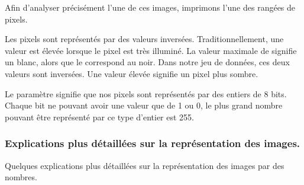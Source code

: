 \documentclass[letterpaper,10pt,french]{sphinxmanual}
\begin{document}
Afin d’analyser précisément l’une de ces images, imprimons l’une des rangées de pixels.

\begin{sphinxVerbatim}[commandchars=\\\{\}]
 \PYG{p}{[} \PYG{p}{]} \PYG{p}{[}\PYG{p}{]}\PYG{p}{[}\PYG{p}{]}
\PYG{p}{[} \PYG{p}{]} \PYG{p}{[}                 
                               
                       
                        
                                
                    \PYG{p}{]} 
\end{sphinxVerbatim}

Les pixels sont représentés par des valeurs  inversées. Traditionnellement, une valeur  est élevée lorsque le pixel est très illuminé. La valeur maximale de signifie un blanc, alors que le correspond au noir. Dans notre jeu de données, ces deux valeurs sont inversées. Une valeur élevée signifie un pixel plus sombre.

Le paramètre signifie que nos pixels sont représentés par des entiers de 8 bits. Chaque bit ne pouvant avoir une valeur que de 1 ou 0, le plus grand nombre pouvant être représenté par ce type d’entier est 255.


\subsubsection{Explications plus détaillées sur la représentation des images.}
\label{\detokenize{preprocessing:explications-plus-detaillees-sur-la-representation-des-images}}
Quelques explications plus détaillées sur la représentation des images par des nombres.
\end{document}
